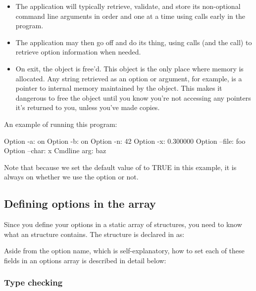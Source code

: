 \begin{itemize}
\item The application will typically retrieve, validate, and store its
      non-optional command line arguments in order and one at a time
      using  calls early in the program.
  
\item The application may then go off and do its thing, using
       calls (and the  call) to
      retrieve option information when needed.

\item On exit, the  object is free'd. This 
      object is the only place where memory is allocated. Any string
      retrieved as an option or argument, for example, is a pointer
      to internal memory maintained by the object. This makes it
      dangerous to free the object until you know you're not accessing
      any pointers it's returned to you, unless you've made copies.
\end{itemize}

An example of running this program:
\begin{cchunk}
   Option -a:      on
   Option -b:      on
   Option -n:      42
   Option -x:      0.300000
   Option --file:  foo
   Option --char:  x
   Cmdline arg:    baz
\end{cchunk}

Note that because we set the default value of  to TRUE in
this example, it is always on whether we use the  option or
not.





\subsection{Defining options in the  array}

Since you define your options in a static array of
 structures, you need to know what an
 structure contains.  The 
structure is declared in  as:



Aside from the option name, which is self-explanatory, how to set each of these
fields in an options array is described in detail below:

   \subsubsection{Type checking}

